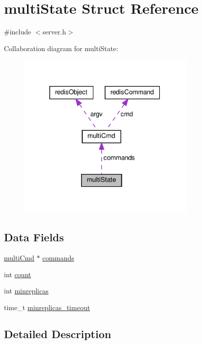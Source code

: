 \hypertarget{structmulti_state}{}\section{multi\+State Struct Reference}
\label{structmulti_state}


{\ttfamily \#include $<$server.\+h$>$}



Collaboration diagram for multi\+State\+:
\nopagebreak
\begin{figure}[H]
\begin{center}
\leavevmode
\includegraphics[width=248pt]{structmulti_state__coll__graph}
\end{center}
\end{figure}
\subsection*{Data Fields}
\begin{DoxyCompactItemize}
\item 
\hyperlink{structmulti_cmd}{multi\+Cmd} $\ast$ \hyperlink{structmulti_state_ad3a26c5b804fb03f82a816ad6d0e5c2f}{commands}
\item 
int \hyperlink{structmulti_state_ad43c3812e6d13e0518d9f8b8f463ffcf}{count}
\item 
int \hyperlink{structmulti_state_ace53526f4550147f18c5ef7a98b54633}{minreplicas}
\item 
time\+\_\+t \hyperlink{structmulti_state_af9fab5f82508da80e8a3725d32cfd75e}{minreplicas\+\_\+timeout}
\end{DoxyCompactItemize}


\subsection{Detailed Description}


